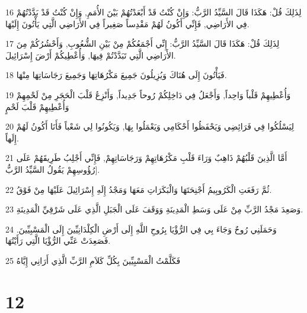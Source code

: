 \par 16 لِذَلِكَ قُلْ: هَكَذَا قَالَ السَّيِّدُ الرَّبُّ: وَإِنْ كُنْتُ قَدْ أَبْعَدْتُهُمْ بَيْنَ الأُمَمِ, وَإِنْ كُنْتُ قَدْ بَدَّدْتُهُمْ فِي الأَرَاضِي, فَإِنِّي أَكُونُ لَهُمْ مَقْدِساً صَغِيراً فِي الأَرَاضِي الَّتِي يَأْتُونَ إِلَيْهَا.
\par 17 لِذَلِكَ قُلْ: هَكَذَا قَالَ السَّيِّدُ الرَّبُّ: إِنِّي أَجْمَعُكُمْ مِنْ بَيْنِ الشُّعُوبِ, وَأَحْشُرُكُمْ مِنَ الأَرَاضِي الَّتِي تَبَدَّدْتُمْ فِيهَا, وَأُعْطِيكُمْ أَرْضَ إِسْرَائِيلَ.
\par 18 فَيَأْتُونَ إِلَى هُنَاكَ وَيُزِيلُونَ جَمِيعَ مَكْرُهَاتِهَا وَجَمِيعَ رَجَاسَاتِهَا مِنْهَا.
\par 19 وَأُعْطِيهِمْ قَلْباً وَاحِداً, وَأَجْعَلُ فِي دَاخِلِكُمْ رُوحاً جَدِيداً, وَأَنْزِعُ قَلْبَ الْحَجَرِ مِنْ لَحْمِهِمْ وَأُعْطِيهِمْ قَلْبَ لَحْمٍ
\par 20 لِيَسْلُكُوا فِي فَرَائِضِي وَيَحْفَظُوا أَحْكَامِي وَيَعْمَلُوا بِهَا, وَيَكُونُوا لِي شَعْباً فَأَنَا أَكُونُ لَهُمْ إِلَهاً.
\par 21 أَمَّا الَّذِينَ قَلْبُهُمْ ذَاهِبٌ وَرَاءَ قَلْبِ مَكْرُهَاتِهِمْ وَرَجَاسَاتِهِمْ, فَإِنِّي أَجْلِبُ طَرِيقَهُمْ عَلَى رُؤُوسِهِمْ يَقُولُ السَّيِّدُ الرَّبُّ].
\par 22 ثُمَّ رَفَعَتِ الْكَرُوبِيمُ أَجْنِحَتَهَا وَالْبَكَرَاتِ مَعَهَا وَمَجْدُ إِلَهِ إِسْرَائِيلَ عَلَيْهَا مِنْ فَوْقُ.
\par 23 وَصَعِدَ مَجْدُ الرَّبِّ مِنْ عَلَى وَسَطِ الْمَدِينَةِ وَوَقَفَ عَلَى الْجَبَلِ الَّذِي عَلَى شَرْقِيِّ الْمَدِينَةِ.
\par 24 وَحَمَلَنِي رُوحٌ وَجَاءَ بِي فِي الرُّؤْيَا بِرُوحِ اللَّهِ إِلَى أَرْضِ الْكِلْدَانِيِّينَ إِلَى الْمَسْبِيِّينَ. فَصَعِدَتْ عَنِّي الرُّؤْيَا الَّتِي رَأَيْتُهَا.
\par 25 فَكَلَّمْتُ الْمَسْبِيِّينَ بِكُلِّ كَلاَمِ الرَّبِّ الَّذِي أَرَانِي إِيَّاهُ

\chapter{12}

